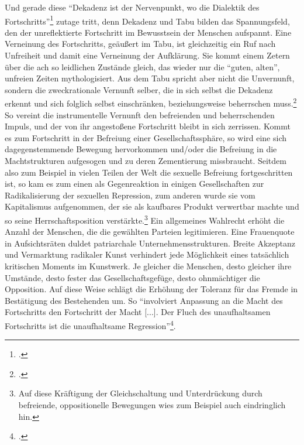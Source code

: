 \documentclass[a4paper, 12pt]{article}
\begin{document}
\begin{onehalfspace}
Und gerade diese "`Dekadenz ist der Nervenpunkt, wo die Dialektik des Fortschritts"'\footnote{\Cite[Siehe][S. 627]{fortschritt}.} zutage tritt, denn Dekadenz und Tabu bilden das Spannungsfeld, den der unreflektierte Fortschritt im Bewusstsein der Menschen aufspannt. Eine Verneinung des Fortschritts, geäußert im Tabu, ist gleichzeitig ein Ruf nach Unfreiheit und damit eine Verneinung der Aufklärung. Sie kommt einem Zetern über die ach so leidlichen Zustände gleich, das wieder nur die "`guten, alten"', unfreien Zeiten mythologisiert. Aus dem Tabu spricht aber nicht die Unvernunft, sondern die zweckrationale Vernunft selber, die in sich selbst die Dekadenz erkennt und sich folglich selbst einschränken, beziehungsweise beherrschen muss.\footnote{\Cite[Vgl.][S. 628]{fortschritt}.} So vereint die instrumentelle Vernunft den befreienden und beherrschenden Impuls, und der von ihr angestoßene Fortschritt bleibt in sich zerrissen. Kommt es zum Fortschritt in der Befreiung einer Gesellschaftssphäre, so wird eine sich da­ge­gen­stem­mende Bewegung hervorkommen und/oder die Befreiung in die Machtstrukturen aufgesogen und zu deren Zementierung missbraucht. Seitdem also zum Beispiel in vielen Teilen der Welt die sexuelle Befreiung fortgeschritten ist, so kam es zum einen als Gegenreaktion in einigen Gesellschaften zur Radikalisierung der sexuellen Repression, zum anderen wurde sie vom Kapitalismus aufgenommen, der sie als kaufbares Produkt verwertbar machte und so seine Herrschaftsposition verstärkte.\footnote{Auf diese Kräftigung der Gleichschaltung und Unterdrückung durch befreiende, oppositionelle Bewegungen wies zum Beispiel auch \citet{marcuse} eindringlich hin.} Ein allgemeines Wahlrecht erhöht die Anzahl der Menschen, die die gewählten Parteien legitimieren. Eine Frauenquote in Aufsichtsräten duldet patriarchale Unternehmensstrukturen. Breite Akzeptanz und Vermarktung radikaler Kunst verhindert jede Möglichkeit eines tatsächlich kritischen Moments im Kunstwerk. Je gleicher die Menschen, desto gleicher ihre Umstände, desto fester das Gesellschaftsgefüge, desto ohnmächtiger die Opposition. Auf diese Weise schlägt die Erhöhung der Toleranz für das Fremde in Bestätigung des Bestehenden um. So "`involviert Anpassung an die Macht des Fortschritts den Fortschritt der Macht [...]. Der Fluch des unaufhaltsamen Fortschritts ist die unaufhaltsame Regression"'\footnote{\Cite[Siehe][S. 42]{dialektik-der-aufklaerung}.}.


\end{onehalfspace}
\end{document}
